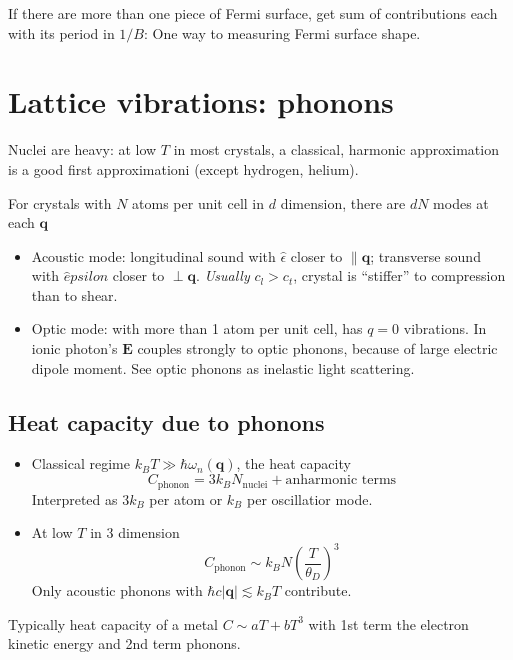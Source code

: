 \documentclass[11pt,letterpaper]{article}
\numberwithin{equation}{section} %
\renewcommand*{\vec}[1]{\bm{#1}}
\begin{document}
If there are more than one piece of Fermi surface, get sum of contributions
each with its period in $1/B$: One way to measuring Fermi surface shape. 

\section{Lattice vibrations: phonons}
\label{sec:lattice_vibrations_phonons}
Nuclei are heavy: at low $T$ in most crystals, a classical, harmonic
approximation is a good first approximationi (except hydrogen, helium).

For crystals with $N$ atoms per unit cell in $d$ dimension, there are $dN$
modes at each $\vec q$
\begin{itemize}
  \item Acoustic mode: longitudinal sound with $\hat \epsilon$ closer to
	  $\parallel \vec q$; transverse sound with $\hat epsilon$ closer to
	  $\perp \vec q$. \emph{Usually} $c_l > c_t$, crystal is ``stiffer'' to
	  compression than to shear. 
  \item Optic mode: with more than 1 atom per unit cell, has $q=0$
	  vibrations. In ionic photon's $\vec E$ couples strongly to optic
	  phonons, because of large electric dipole moment. See optic phonons as
	  inelastic light scattering. 
\end{itemize}

\subsection{Heat capacity due to phonons}
\label{sub:heat_capacity_due_to_phonons}
\begin{itemize}
	\item Classical regime $k_BT \gg \hbar \omega_n(\vec q)$, the heat capacity
	\begin{equation}
		C_{\mbox{phonon}} = 3k_B N_{\mbox{nuclei}} + \mbox{anharmonic terms}
	\end{equation}
	Interpreted as $3k_B$ per atom or $k_B$ per oscillatior mode. 
	\item At low $T$ in 3 dimension
		\begin{equation}
			C_{\mbox{phonon}} \sim k_B N \left(\frac T{\theta_D}\right)^3
		\end{equation}
		Only acoustic phonons with $\hbar c|\vec q|\lesssim k_BT$
		contribute. 
\end{itemize}
Typically heat capacity of a metal $C\sim aT + bT^3$ with 1st term the
electron kinetic energy and 2nd term phonons.  
\end{document}
